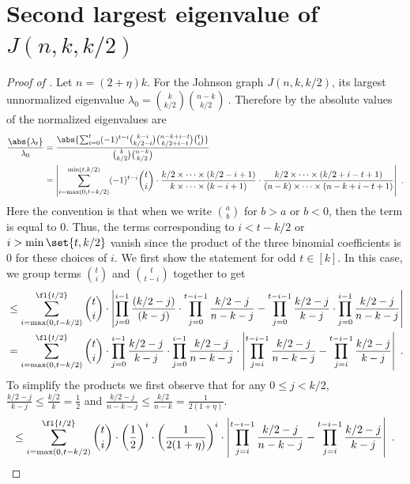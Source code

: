 \section[Second largest eigenvalue of J(n,k,k/2)]{Second largest eigenvalue of $J(n,k,k/2)$}
 \label{app:proofs-of-Johnson-lambda2}
\begin{proof}[Proof of ]
    Let $n= (2+\eta)k$. For the Johnson graph $J(n,k,k/2)$, its largest unnormalized eigenvalue
    $\lambda_0 = \binom{k}{k/2} \binom{n-k}{k/2}~.$
    Therefore by  the absolute values of the normalized eigenvalues are 
    \begin{align*}
        \frac{\abs{\lambda_t}}{\lambda_0} 
        &= \frac{\abs{\sum_{i=0}^t (-1)^{t-i} \binom{k-i}{k/2-i} \binom{n-k+i-t}{k/2+i-t}\binom{t}{i}}}{\binom{k}{k/2} \binom{n-k}{k/2}}   \\
        &= \left| \sum_{i=\max(0,t-k/2)}^{\min(t,k/2)} (-1)^{t-i} \binom{t}{i} \cdot \frac{k/2\times \dots \times (k/2-i+1)}{k\times\dots\times (k-i+1)} \cdot \frac{k/2\times \dots \times (k/2+i-t+1)}{(n-k)\times\dots\times (n-k+i-t+1)}  \right| ~.\\
    \end{align*}
    Here the convention is that when we write \(\binom{a}{b}\) for \(b>a\) or \(b<0\), then the term is equal to \(0\). Thus, the terms corresponding to $i< t-k/2$ or $i>\min\set{t,k/2}$ vanish since the product of the three binomial coefficients is $0$ for these choices of $i$. We first show the statement for odd $t\in[k]$. In this case, we group terms $\binom{t}{i}$ and $\binom{t}{t-i}$ together to get 
    \begin{align*}
        &\le \sum_{i=\max(0,t-k/2)}^{\fl{t/2}} \binom{t}{i}\cdot \left|  \prod_{j=0}^{i-1} \frac{ (k/2-j)}{(k-j)} \cdot \prod_{j=0}^{t-i-1} \frac{  k/2-j}{ n-k-j}   -    \prod_{j=0}^{t-i-1}\frac{ k/2-j}{k-j} \cdot \prod_{j=0}^{i-1}\frac{  k/2-j}{n-k-j}  \right| \\
        &= \sum_{i=\max(0,t-k/2)}^{\fl{t/2}} \binom{t}{i}  \cdot    \prod_{j=0}^{i-1}\frac{ k/2-j}{k-j} \cdot \prod_{j=0}^{i-1} \frac{ k/2-j}{n-k-j}  \cdot \left| \prod_{j=i}^{t-i-1}\frac{k/2-j}{ n-k-j} - \prod_{j=i}^{t-i-1} \frac{k/2-j}{k-j} \right| ~.
    \end{align*}
    To simplify the products we first observe that for any $0\le j < k/2 $, $\frac{k/2-j}{k-j} \le \frac{k/2}{k} = \frac{1}{2}$ and $\frac{k/2-j}{n-k-j} \le \frac{k/2}{n-k} = \frac{1}{2(1+\eta)}$.
    \begin{equation}\label{eq:e1}
        \le \sum_{i=\max(0,t-k/2)}^{\fl{t/2}} \binom{t}{i}   \cdot \left(\frac{1}{2}\right)^{i}  \cdot \left(\frac{1}{2(1+\eta)}\right)^{i} \cdot \left| \prod_{j=i}^{t-i-1}\frac{k/2-j}{ n-k-j} - \prod_{j=i}^{t-i-1} \frac{k/2-j}{k-j} \right| ~.
    \end{equation}
    

\end{proof}
